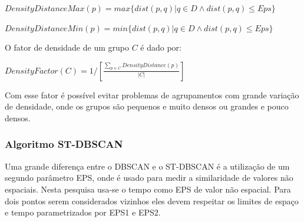 ${DensityDistanceMax(p) = max\big\{ dist(p, q) | q \in D \wedge dist(p, q)  \leqslant Eps\big\} }$

${DensityDistanceMin(p) = min\big\{ dist(p, q) | q \in D \wedge dist(p, q)  \leqslant Eps\big\} }$
\linebreak

O fator de densidade de um grupo ${C}$ é dado por:

${DensityFactor(C) = 1\big/\left [   \frac{\sum_{p\in C}DensityDistance(p)}{|C|} \right ]
}$
\linebreak

Com esse fator é possível evitar problemas de agrupamentos com grande variação de densidade, onde os grupos são pequenos e muito densos ou grandes e pouco densos.

\subsubsection{Algoritmo ST-DBSCAN}
Uma grande diferença entre o DBSCAN e o ST-DBSCAN é a utilização de um segundo parâmetro EPS, onde é usado para medir a similaridade de valores não espaciais. Nesta pesquisa usa-se o tempo como EPS de valor não espacial. Para dois pontos serem considerados vizinhos eles devem respeitar os limites de espaço e tempo parametrizados por EPS1 e EPS2.

